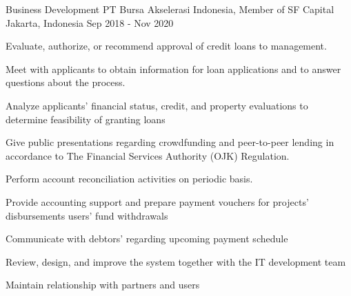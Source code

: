 \begin{cventries}
  \cventry
    {Business Development} %
    {PT Bursa Akselerasi Indonesia, Member of SF Capital} %
    {Jakarta, Indonesia} %
    {Sep 2018 - Nov 2020} %
    {
      \begin{cvitems} %
        \item {Evaluate, authorize, or recommend approval of credit loans to management.}
        \item {Meet with applicants to obtain information for loan applications and to answer questions about the process.}
        \item {Analyze applicants’ financial status, credit, and property evaluations to determine feasibility of granting loans}
        \item {Give public presentations regarding crowdfunding and peer-to-peer lending in accordance to The Financial Services Authority (OJK) Regulation.}
        \item {Perform account reconciliation activities on periodic basis.}
        \item {Provide accounting support and prepare payment vouchers for projects’ disbursements users’ fund withdrawals}
        \item {Communicate with debtors’ regarding upcoming payment schedule}
        \item {Review, design, and improve the system together with the IT development team}
        \item {Maintain relationship with partners and users}
      \end{cvitems}
    }


\end{cventries}
